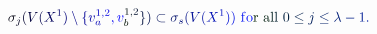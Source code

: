 \documentclass[12pt]{article}
\begin{document}
\makeatletter
\renewcommand*{\@textcolor}[3]{%
  \protect\leavevmode
  \begingroup
    \color#1{#2}#3%
  \endgroup
}
\makeatother
\begin{displaymath}
\mathcolor[RGB]{0,0,15}{\sigma} _ { \mathcolor[RGB]{0,0,30}{j} } \mathcolor[RGB]{0,0,45}{(} \mathcolor[RGB]{0,0,60}{V} \mathcolor[RGB]{0,0,75}{(} \mathcolor[RGB]{0,0,90}{X} ^ { \mathcolor[RGB]{0,0,105}{1} } \mathcolor[RGB]{0,0,120}{)} \mathcolor[RGB]{0,0,135}{\setminus} \mathcolor[RGB]{0,0,150}{\{} \mathcolor[RGB]{0,0,165}{v} _ { \mathcolor[RGB]{0,0,180}{a} } ^ { \mathcolor[RGB]{0,0,195}{1} \mathcolor[RGB]{0,0,210}{,} \mathcolor[RGB]{0,0,225}{2} } \mathcolor[RGB]{0,0,240}{,} \mathcolor[RGB]{0,0,255}{v} _ { \mathcolor[RGB]{0,15,0}{b} } ^ { \mathcolor[RGB]{0,15,15}{1} \mathcolor[RGB]{0,15,30}{,} \mathcolor[RGB]{0,15,45}{2} } \mathcolor[RGB]{0,15,60}{\}} \mathcolor[RGB]{0,15,75}{)} \mathcolor[RGB]{0,15,90}{\subset} \mathcolor[RGB]{0,15,105}{\sigma} _ { \mathcolor[RGB]{0,15,120}{s} } \mathcolor[RGB]{0,15,135}{(} \mathcolor[RGB]{0,15,150}{V} \mathcolor[RGB]{0,15,165}{(} \mathcolor[RGB]{0,15,180}{X} ^ { \mathcolor[RGB]{0,15,195}{1} } \mathcolor[RGB]{0,15,210}{)} \mathcolor[RGB]{0,15,225}{)} \mathrm { ~ \mathcolor[RGB]{0,15,240}{f} \mathcolor[RGB]{0,15,255}{o} \mathcolor[RGB]{0,30,0}{r} ~ \mathcolor[RGB]{0,30,15}{a} \mathcolor[RGB]{0,30,30}{l} \mathcolor[RGB]{0,30,45}{l} ~ } \mathcolor[RGB]{0,30,60}{0} \mathcolor[RGB]{0,30,75}{\leq} \mathcolor[RGB]{0,30,90}{j} \mathcolor[RGB]{0,30,105}{\leq} \mathcolor[RGB]{0,30,120}{\lambda} \mathcolor[RGB]{0,30,135}{-} \mathcolor[RGB]{0,30,150}{1} \mathcolor[RGB]{0,30,165}{.}
\end{displaymath}
\end{document}
